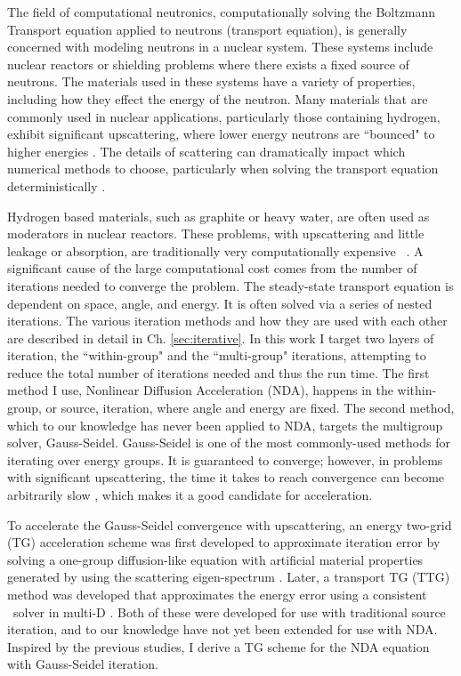 The field of computational neutronics, computationally solving the Boltzmann Transport equation applied to neutrons (transport equation), is generally concerned with modeling neutrons in a nuclear system. These systems include nuclear reactors or shielding problems where there exists a fixed source of neutrons. The materials used in these systems have a variety of properties, including how they effect the energy of the neutron. Many materials that are commonly used in nuclear applications, particularly those containing hydrogen, exhibit significant upscattering, where lower energy neutrons are ``bounced" to higher energies \cite{IKE,njoy2012,macfarlane-1994,malik,zheng-freegas,zheng-emulation,zheng-masterthesis}. The details of scattering can dramatically impact which numerical methods to choose, particularly when solving the transport equation deterministically \cite{park-nda}. 

Hydrogen based materials, such as graphite or heavy water, are often used as moderators in nuclear reactors. These problems, with upscattering and little leakage or absorption, are traditionally very computationally expensive ~\cite{morel-upscat}. A significant cause of the large computational cost comes from the number of iterations needed to converge the problem. The steady-state transport equation is dependent on space, angle, and energy. It is often solved via a series of nested iterations. The various iteration methods and how they are used with each other are described in detail in Ch. \ref{sec:iterative}. In this work I target two layers of iteration, the ``within-group" and the ``multi-group" iterations, attempting to reduce the total number of iterations needed and thus the run time. The first method I use, Nonlinear Diffusion Acceleration (NDA), happens in the within-group, or source, iteration, where angle and energy are fixed. The second method, which to our knowledge has never been applied to NDA, targets the multigroup solver, Gauss-Seidel. Gauss-Seidel is one of the most commonly-used methods for iterating over energy groups. It is guaranteed to converge; however, in problems with significant upscattering, the time it takes to reach convergence can become arbitrarily slow \cite{evans-upscat}, which makes it a good candidate for acceleration. 

To accelerate the Gauss-Seidel convergence with upscattering, an energy two-grid (TG) acceleration scheme was first developed to approximate iteration error by solving a one-group diffusion-like equation with artificial material properties generated by using the scattering eigen-spectrum \cite{morel-upscat}. Later, a transport TG (TTG) method was developed that approximates the energy error using a consistent \sn\ solver in multi-D \cite{evans-upscat}. Both of these were developed for use with traditional source iteration, and to our knowledge have not yet been extended for use with NDA. Inspired by the previous studies, I derive a TG scheme for the NDA equation with Gauss-Seidel iteration.


